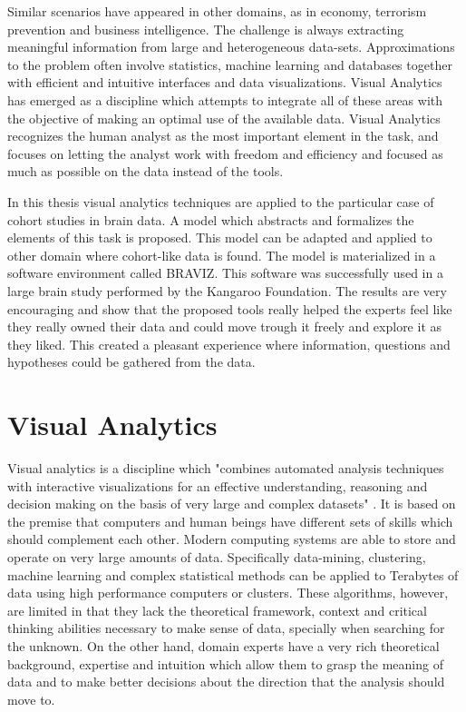 Similar scenarios have appeared in other domains, as in economy, terrorism prevention and business intelligence. The challenge is always extracting meaningful information from large and heterogeneous data-sets. Approximations to the problem often involve statistics, machine learning and databases together with efficient and intuitive interfaces and data visualizations. Visual Analytics has emerged as a discipline which attempts to integrate all of these areas with the objective of making an optimal use of the available data. Visual Analytics recognizes the human analyst as the most important element in the task, and focuses on letting the analyst work with freedom and efficiency and focused as much as possible on the data instead of the tools.

In this thesis visual analytics techniques are applied to the particular case of cohort studies in brain data. A model which abstracts and formalizes the elements of this task is proposed. This model can be adapted and applied to other domain where cohort-like data is found. The model is materialized in a software environment called BRAVIZ. This software was successfully used in a large brain study performed by the Kangaroo Foundation. The results are very encouraging and show that the proposed tools really helped the experts feel like they really owned their data and could move trough it freely and explore it as they liked. This created a pleasant experience where information, questions and hypotheses could be gathered from the data.


\section{Visual Analytics}


Visual analytics is a discipline which "combines automated analysis techniques with interactive
visualizations for an effective understanding, reasoning and decision making on the basis of very
large and complex datasets" \autocite{cook_illuminating_2005}. It is based on the premise that computers and
human beings have different sets of skills which should complement each other. Modern
computing systems are able to store and operate on very large amounts of data.
Specifically data-mining, clustering, machine learning and complex statistical methods can be
applied to Terabytes of data using high performance computers or clusters. These
algorithms, however, are limited in that they lack the theoretical framework, context and critical
thinking abilities necessary to make sense of data, specially when searching for the unknown. 
On the other hand, domain experts have a very rich theoretical
background, expertise and intuition which allow them to grasp the meaning of data and to
make better decisions about the direction that the analysis should move to. 

